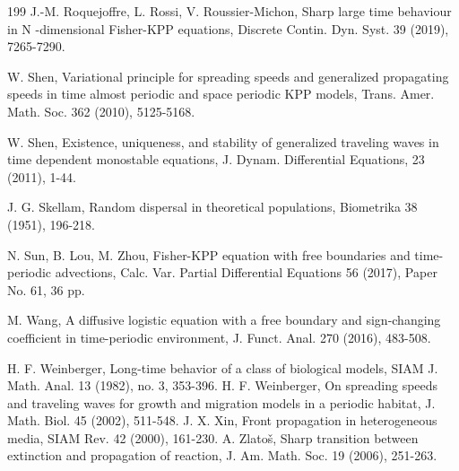 \documentclass[11pt]{amsart}
\numberwithin{equation}{section}
\begin{document}
\begin{thebibliography}{199}
 J.-M. Roquejoffre, L. Rossi, V. Roussier-Michon, Sharp large time behaviour in  N -dimensional Fisher-KPP equations, Discrete Contin. Dyn. Syst. 39 (2019),   7265-7290.


 W. Shen,   Variational principle for spreading speeds and generalized propagating speeds in time almost periodic and space periodic KPP models, Trans. Amer. Math. Soc. 362 (2010), 5125-5168.

W. Shen, Existence, uniqueness, and stability of generalized traveling waves in time dependent
monostable equations, J. Dynam. Differential Equations, 23 (2011), 1-44.


 J. G. Skellam, Random dispersal in theoretical populations, Biometrika  38 (1951), 196-218.
 
  N. Sun, B. Lou, M. Zhou, Fisher-KPP equation with free boundaries and time-periodic advections, Calc. Var. Partial Differential Equations 56 (2017), Paper No. 61, 36 pp.

 M. Wang, A diffusive logistic equation with a free boundary and sign-changing coefficient in time-periodic environment, J. Funct. Anal. 270 (2016), 483-508.

  H. F. Weinberger,  Long-time behavior of a class of biological models, SIAM J. Math. Anal. 13 (1982), no. 3, 353-396.
 H. F. Weinberger, On spreading speeds and traveling waves for growth and migration models
in a periodic habitat, J. Math. Biol. 45 (2002), 511-548.
 J. X. Xin, Front propagation in heterogeneous media, SIAM Rev. 42 (2000), 161-230.
A. Zlato\v{s}, Sharp transition between extinction and propagation of reaction, J. Am. Math. Soc. 19 (2006), 251-263.
 
\end{thebibliography}
\end{document}
